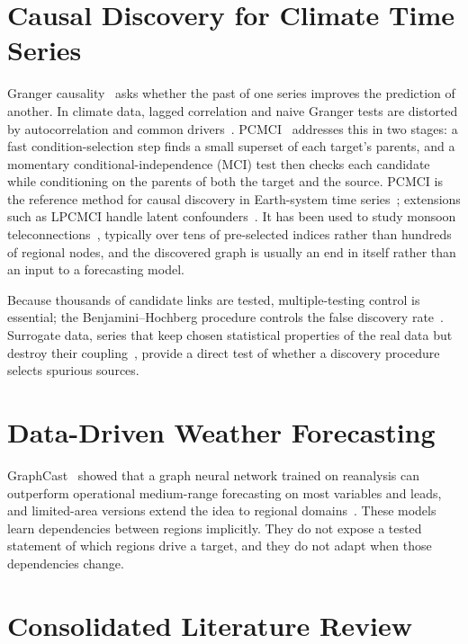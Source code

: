 \section{Causal Discovery for Climate Time Series}
\label{sec:lit-pcmci}

Granger causality~\cite{granger1969investigating} asks whether the past of one series improves the prediction of another. In climate data, lagged correlation and naive Granger tests are distorted by autocorrelation and common drivers~\cite{runge2014quantifying}. PCMCI~\cite{runge2019detecting} addresses this in two stages: a fast condition-selection step finds a small superset of each target's parents, and a momentary conditional-independence (MCI) test then checks each candidate while conditioning on the parents of both the target and the source. PCMCI is the reference method for causal discovery in Earth-system time series~\cite{runge2019inferring,runge2018causal}; extensions such as LPCMCI handle latent confounders~\cite{gerhardus2020high}. It has been used to study monsoon teleconnections~\cite{dicapua2020tropical}, typically over tens of pre-selected indices rather than hundreds of regional nodes, and the discovered graph is usually an end in itself rather than an input to a forecasting model.

Because thousands of candidate links are tested, multiple-testing control is essential; the Benjamini--Hochberg procedure controls the false discovery rate~\cite{benjamini1995controlling}. Surrogate data, series that keep chosen statistical properties of the real data but destroy their coupling~\cite{theiler1992testing,schreiber2000surrogate}, provide a direct test of whether a discovery procedure selects spurious sources.

\section{Data-Driven Weather Forecasting}
\label{sec:lit-weather}

GraphCast~\cite{lam2023learning} showed that a graph neural network trained on reanalysis can outperform operational medium-range forecasting on most variables and leads, and limited-area versions extend the idea to regional domains~\cite{oskarsson2023graph}. These models learn dependencies between regions implicitly. They do not expose a tested statement of which regions drive a target, and they do not adapt when those dependencies change.

\section{Consolidated Literature Review}
\label{sec:lit-table}

